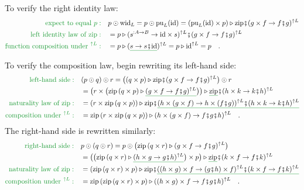 To verify the right identity law:
\begin{align*}
{\color{greenunder}\text{expect to equal }p:}\quad & p\odot\text{wid}_{L}=p\odot\text{pu}_{L}(\text{id})=(\text{pu}_{L}(\text{id})\times p)\triangleright\text{zip}\bef(g\times f\rightarrow f\bef g)^{\uparrow L}\\
{\color{greenunder}\text{left identity law of }\text{zip}:}\quad & =p\triangleright(s^{:A\rightarrow B}\rightarrow\text{id}\times s)^{\uparrow L}\bef(g\times f\rightarrow f\bef g)^{\uparrow L}\\
{\color{greenunder}\text{function composition under }^{\uparrow L}:}\quad & =p\triangleright(\gunderline{s\rightarrow s\bef\text{id}})^{\uparrow L}=p\triangleright\text{id}^{\uparrow L}=p\quad.
\end{align*}

To verify the composition law, begin rewriting its left-hand side:
\begin{align*}
{\color{greenunder}\text{left-hand side}:}\quad & (p\odot q)\odot r=\big((q\times p)\triangleright\text{zip}\bef(g\times f\rightarrow f\bef g)^{\uparrow L}\big)\odot r\\
 & =\big(r\times\big(\text{zip}\left(q\times p\right)\triangleright\gunderline{(g\times f\rightarrow f\bef g)^{\uparrow L}}\big)\big)\triangleright\gunderline{\text{zip}}\bef(h\times k\rightarrow k\bef h)^{\uparrow L}\\
{\color{greenunder}\text{naturality law of }\text{zip}:}\quad & =(r\times\text{zip}\left(q\times p\right))\triangleright\text{zip}\bef\gunderline{(h\times(g\times f)\rightarrow h\times(f\bef g))^{\uparrow L}\bef(h\times k\rightarrow k\bef h)^{\uparrow L}}\\
{\color{greenunder}\text{composition under }^{\uparrow L}:}\quad & =\text{zip}\left(r\times\text{zip}\left(q\times p\right)\right)\triangleright(h\times(g\times f)\rightarrow f\bef g\bef h)^{\uparrow L}\quad.
\end{align*}
The right-hand side is rewritten similarly:
\begin{align*}
{\color{greenunder}\text{right-hand side}:}\quad & p\odot(q\odot r)=p\odot\big(\text{zip}\left(q\times r\right)\triangleright(g\times f\rightarrow f\bef g)^{\uparrow L}\big)\\
 & =\big(\big(\text{zip}\left(q\times r\right)\triangleright\gunderline{(h\times g\rightarrow g\bef h)^{\uparrow L}}\big)\times p\big)\triangleright\gunderline{\text{zip}}\bef(k\times f\rightarrow f\bef k)^{\uparrow L}\\
{\color{greenunder}\text{naturality law of }\text{zip}:}\quad & =(\text{zip}\left(q\times r\right)\times p)\triangleright\text{zip}\bef\gunderline{((h\times g)\times f\rightarrow(g\bef h)\times f)^{\uparrow L}\bef(k\times f\rightarrow f\bef k)^{\uparrow L}}\\
{\color{greenunder}\text{composition under }^{\uparrow L}:}\quad & =\text{zip}\left(\text{zip}\left(q\times r\right)\times p\right)\triangleright((h\times g)\times f\rightarrow f\bef g\bef h)^{\uparrow L}\quad.
\end{align*}
